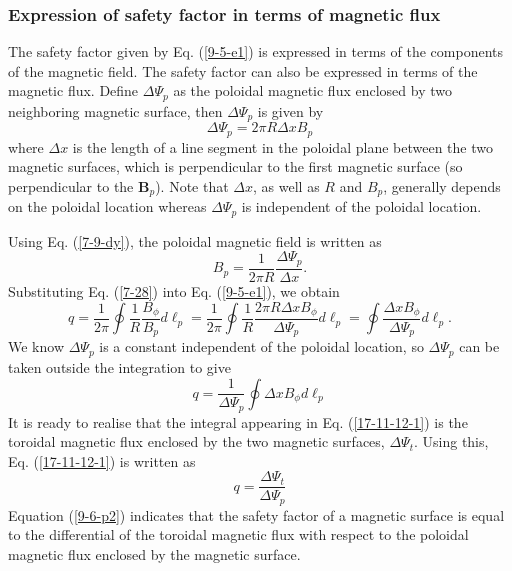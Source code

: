 \documentclass{llncs}
\begin{document}
\subsubsection{Expression of safety factor in terms of magnetic flux}

The safety factor given by Eq. (\ref{9-5-e1}) is expressed in terms of the
components of the magnetic field. The safety factor can also be expressed in
terms of the magnetic flux. Define $\Delta \Psi_p$ as the poloidal magnetic
flux enclosed by two neighboring magnetic surface, then $\Delta \Psi_p$ is
given by
\begin{equation}
  \label{7-9-dy} \Delta \Psi_p = 2 \pi R \Delta x B_p
\end{equation}
where $\Delta x$ is the length of a line segment in the poloidal plane between
the two magnetic surfaces, which is perpendicular to the first magnetic
surface (so perpendicular to the $\mathbf{B}_p$). Note that $\Delta x$, as
well as $R$ and $B_p$, generally depends on the poloidal location whereas
$\Delta \Psi_p$ is independent of the poloidal location.

Using Eq. (\ref{7-9-dy}), the poloidal magnetic field is written as
\begin{equation}
  \label{7-28} B_p = \frac{1}{2 \pi R}  \frac{\Delta \Psi_p}{\Delta x} .
\end{equation}
Substituting Eq. (\ref{7-28}) into Eq. (\ref{9-5-e1}), we obtain
\begin{equation}
  q = \frac{1}{2 \pi} \oint \frac{1}{R} \frac{B_{\phi}}{B_p} d \ell_p =
  \frac{1}{2 \pi} \oint \frac{1}{R} \frac{2 \pi R \Delta x B_{\phi}}{\Delta
  \Psi_p} d \ell_p = \oint \frac{\Delta x B_{\phi}}{\Delta \Psi_p} d \ell_p .
\end{equation}
We know $\Delta \Psi_p$ is a constant independent of the poloidal location, so
$\Delta \Psi_p$ can be taken outside the integration to give
\begin{equation}
  \label{17-11-12-1} q = \frac{1}{\Delta \Psi_p} \oint \Delta x B_{\phi} d
  \ell_p
\end{equation}
It is ready to realise that the integral appearing in Eq. (\ref{17-11-12-1})
is the toroidal magnetic flux enclosed by the two magnetic surfaces, $\Delta
\Psi_t$. Using this, Eq. (\ref{17-11-12-1}) is written as
\begin{equation}
  \label{9-6-p2} q = \frac{\Delta \Psi_t}{\Delta \Psi_p}
\end{equation}
Equation (\ref{9-6-p2}) indicates that the safety factor of a magnetic surface
is equal to the differential of the toroidal magnetic flux with respect to the
poloidal magnetic flux enclosed by the magnetic surface.
\end{document}
